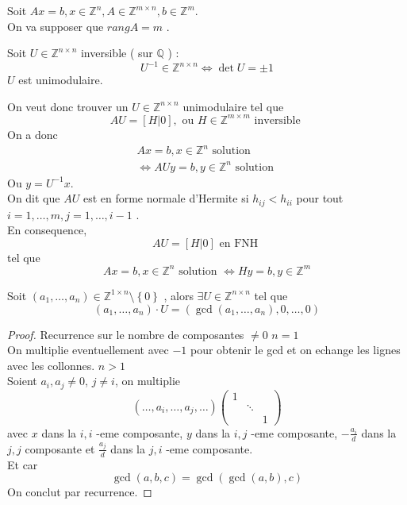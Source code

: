 \documentclass[../main.tex]{subfiles}
\begin{document}
Soit $Ax = b, x \in \mathbb{Z}^{n}, A \in \mathbb{Z}^{m\times n},b \in \mathbb{Z}^{m}$.\\
On va supposer que $rang A = m$ .\\
\begin{lemma}
	Soit $U \in \mathbb{Z}^{n \times n}$ inversible ( sur $\mathbb{Q}$ ) :
	\[ 
		U^{-1}\in \mathbb{Z}^{n\times n}\iff \det U = \pm 1
	\]
	$U$ est unimodulaire.
\end{lemma}
On veut donc trouver un $U \in \mathbb{Z}^{n\times n}$ unimodulaire tel que 
\[ 
AU = [ H|0] , \text{ ou }  H \in \mathbb{Z}^{m\times m}  \text{ inversible  } 
\]
On a donc
\begin{align*}
Ax = b, x \in \mathbb{Z}^{n} \text{ solution } \\
\iff AUy = b, y \in \mathbb{Z}^{n} \text{ solution } 
\end{align*}
Ou $y = U^{-1}x$.\\
On dit que $AU$ est en forme normale d'Hermite si $h_{ij} < h_{ii} $ pour tout $i =1, \ldots, m, j = 1, \ldots, i-1$ .\\
En consequence, 
\[ 
AU = [ H|0] \text{ en FNH } 
\]
tel que 
\[ 
Ax = b, x \in \mathbb{Z}^{n} \text{ solution  } \iff Hy = b, y \in \mathbb{Z}^{m}
\]
\begin{lemma}
	Soit $ ( a_1, \ldots, a_n)  \in \mathbb{Z}^{1\times n} \setminus \left\{ 0 \right\} $ , alors $\exists U \in \mathbb{Z}^{n\times n}$  tel que
	\[ 
		( a_1, \ldots, a_n) \cdot U = ( \gcd ( a_1, \ldots, a_n) , 0, \ldots,0) 
	\]

\end{lemma}
\begin{proof}
Recurrence sur le nombre de composantes $\neq 0$ 
$n=1$ \\
On multiplie eventuellement avec $-1$ pour obtenir le gcd et on echange les lignes avec les collonnes.
$n>1$ \\
Soient $a_i, a_j \neq 0$, $j \neq i$, on multiplie 
\[ 
	( \ldots,a_i,\ldots, a_j, \ldots) 
	\begin{pmatrix}
		1 & &\\
		  & \ddots &\\
		  & & 1
	\end{pmatrix} 
\]
avec $x $ dans la $i,i$ -eme composante, $y$ dans la $i,j$ -eme composante, $- \frac{a_i}{d}$ dans la $j,j$ composante et $ \frac{a_j}{d}$ dans la $j,i$ -eme composante.\\
Et car
\[ 
	\gcd ( a,b,c) = \gcd ( \gcd( a,b) ,c) 
\]
On conclut par recurrence.

\end{proof}
\end{document}
